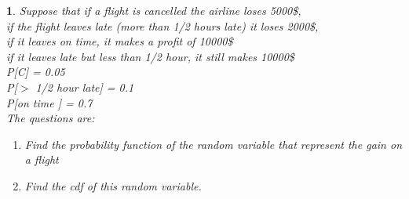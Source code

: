 \documentclass[11pt]{article}
\newtheorem{example}{\framebox{Ex}}[section]
\begin{document}
            \begin{example}
                Suppose that if a flight is cancelled the airline loses 5000\$, \\
                if the flight leaves late (more than 1/2 hours late) it loses 2000\$,\\
                if it leaves on time, it makes a profit of 10000\$\\
                if it leaves late but less than 1/2 hour, it still makes 10000\$\\
                P[C] = 0.05\\
                P[$>$ 1/2 hour late] = 0.1 \\
                P[on time ] = 0.7\\
                The questions are:
                \begin{enumerate}
                    \item Find the probability function of the random variable that represent the gain on a flight
                    \item Find the cdf of this random variable.
                \end{enumerate}
            \end{example}
\end{document}
